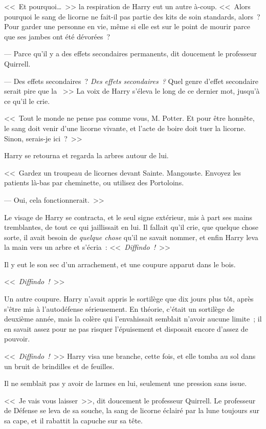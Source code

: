 <<~Et pourquoi…~>> la respiration de Harry eut un autre à-coup. <<~Alors pourquoi le sang de licorne ne fait-il pas partie des kits de soin standards, alors~? Pour garder une personne en vie, même si elle est sur le point de mourir parce que ses jambes ont été dévorées~?

--- Parce qu'il y a des effets secondaires permanents, dit doucement le professeur Quirrell.

--- Des effets secondaires~? \emph{Des effets secondaires~?} Quel genre d'effet secondaire serait pire que la ~>> La voix de Harry s'éleva le long de ce dernier mot, jusqu'à ce qu'il le crie.

<<~Tout le monde ne pense pas comme vous, M. Potter. Et pour être honnête, le sang doit venir d'une licorne vivante, et l'acte de boire doit tuer la licorne. Sinon, serais-je ici~?~>>

Harry se retourna et regarda la arbres autour de lui.

<<~Gardez un troupeau de licornes devant Sainte. Mangouste. Envoyez les patients là-bas par cheminette, ou utilisez des Portoloins.

--- Oui, cela fonctionnerait.~>>

Le visage de Harry se contracta, et le seul signe extérieur, mis à part ses mains tremblantes, de tout ce qui jaillissait en lui. Il fallait qu'il crie, que quelque chose sorte, il avait besoin de \emph{quelque chose} qu'il ne savait nommer, et enfin Harry leva la main vers un arbre et s'écria~: <<~\emph{Diffindo~!}~>>

Il y eut le son sec d'un arrachement, et une coupure apparut dans le bois.

<<~\emph{Diffindo~!}~>>

Un autre coupure. Harry n'avait appris le sortilège que dix jours plus tôt, après s'être mis à l'autodéfense sérieusement. En théorie, c'était un sortilège de deuxième année, mais la colère qui l'envahissait semblait n'avoir aucune limite~; il en savait assez pour ne pas risquer l'épuisement et disposait encore d'assez de pouvoir.

<<~\emph{Diffindo~!}~>> Harry visa une branche, cette fois, et elle tomba au sol dans un bruit de brindilles et de feuilles.

Il ne semblait pas y avoir de larmes en lui, seulement une pression sans issue.

<<~Je vais vous laisser~>>, dit doucement le professeur Quirrell. Le professeur de Défense se leva de sa souche, la sang de licorne éclairé par la lune toujours sur sa cape, et il rabattit la capuche sur sa tête. 

